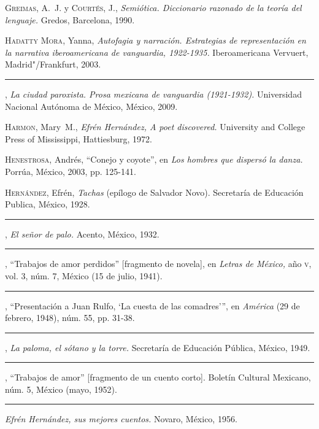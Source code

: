 \documentclass[14pt,twoside,final]{extbook} %
\begin{document}
\textsc{Greimas}, A.~J. y \textsc{Courtés}, J., \emph{Semiótica. Diccionario razonado de la teoría del lenguaje.} Gredos, Barcelona, 1990.\label{bib:greimas1990}

\textsc{Hadatty Mora}, Yanna, \emph{Autofagia y narración. Estrategias de representación en la narrativa iberoamericana de vanguardia, 1922-1935.} Iberoamericana Vervuert, Madrid"/Frankfurt, 2003.\label{bib:hadatty2003}

\rule{1cm}{0.4pt}, \emph{La ciudad paroxista. Prosa mexicana de vanguardia (1921-1932).} Universidad Nacional Autónoma de México, México, 2009.\label{bib:hadatty2009}

\textsc{Harmon}, Mary~M., \emph{Efrén Hernández, A poet discovered.} University and College Press of Mississippi, Hattiesburg, 1972.\label{bib:harmon1972}

\textsc{Henestrosa}, Andrés, ``Conejo y coyote'', en \emph{Los hombres que dispersó la danza.} Porrúa, México, 2003, pp. 125-141.\label{bib:henestroza2003}

\textsc{Hernández}, Efrén, \emph{Tachas} (epílogo de Salvador Novo). Secretaría de Educación Publica, México, 1928.\label{bib:hernandez1928}

\rule{1cm}{0.4pt}, \emph{El señor de palo.} Acento, México, 1932.\label{bib:hernandez1932}

\rule{1cm}{0.4pt}, ``Trabajos de amor perdidos'' [fragmento de novela], en \emph{Letras de México,} año \textsc{v}, vol. 3, núm. 7, México (15 de julio, 1941).\label{bib:hernandez1941}

\rule{1cm}{0.4pt}, ``Presentación a Juan Rulfo, `La cuesta de las comadres'{}'', en \emph{América} (29 de febrero, 1948), núm. 55, pp. 31-38.\label{bib:hernandez1948}

\rule{1cm}{0.4pt}, \emph{La paloma, el sótano y la torre.} Secretaría de Educación Pública, México, 1949.\label{bib:hernandez1949}

\rule{1cm}{0.4pt}, ``Trabajos de amor'' [fragmento de un cuento corto]. Boletín Cultural Mexicano, núm. 5, México (mayo, 1952).\label{bib:hernandez1952}

\rule{1cm}{0.4pt} \emph{Efrén Hernández, sus mejores cuentos.} Novaro, México, 1956.\label{bib:hernandez1956}
\end{document}
